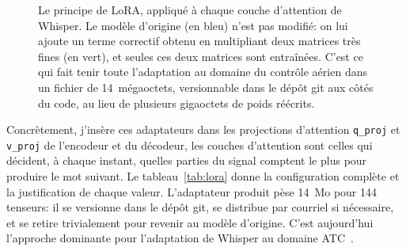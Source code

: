 \documentclass[11pt,a4paper]{article}
\begin{document}
\begin{figure}[!htbp]
\centering
{}
\caption[Le principe de LoRA, appliqué à chaque couche d'attention de Whisper]{Le principe de LoRA, appliqué à chaque couche d'attention de Whisper. Le modèle
d'origine (en bleu) n'est pas modifié: on lui ajoute un terme correctif obtenu en
multipliant deux matrices très fines (en vert), et seules ces deux matrices sont entraînées.
C'est ce qui fait tenir toute l'adaptation au domaine du contrôle aérien dans un fichier de
14~mégaoctets, versionnable dans le dépôt git aux côtés du code, au lieu de plusieurs
gigaoctets de poids réécrits.}
\label{fig:lora}
\end{figure}

Concrètement, j'insère ces adaptateurs dans les projections d'attention \texttt{q\_proj} et \texttt{v\_proj} de l'encodeur et du décodeur, les couches d'attention sont celles qui décident, à chaque instant, quelles parties du signal comptent le plus pour produire le mot suivant. Le tableau~\ref{tab:lora} donne la configuration complète et la justification de chaque valeur. L'adaptateur produit pèse 14~Mo pour 144 tenseurs: il se versionne dans le dépôt git, se distribue par courriel si nécessaire, et se retire trivialement pour revenir au modèle d'origine. C'est aujourd'hui l'approche dominante pour l'adaptation de Whisper au domaine ATC~\cite{suhaq,whisperatc}. 
\end{document}

